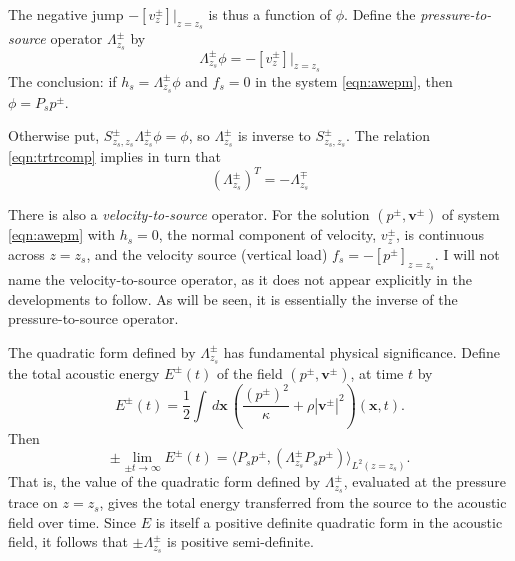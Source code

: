 \documentclass[georeport,12pt]{geophysics}
\newcommand{\bx}{\mathbf{x}}
\newcommand{\bv}{\mathbf{v}}
\begin{document}
The negative jump $-[v^{\pm}_{z}]|_{z=z_s}$ is thus a function of $\phi$. Define
the {\em pressure-to-source} operator $\Lambda^{\pm}_{z_s}$ by
\begin{equation}
  \label{eqn:deflam}
  \Lambda^{\pm}_{z_s}\phi = -[v^{\pm}_{z}]|_{z=z_s}
\end{equation}
The conclusion: if $h_s = \Lambda^{\pm}_{z_s}\phi$ and $f_s=0$ in the
system \ref{eqn:awepm}, then $\phi=P_sp^{\pm}$.

Otherwise put, $S^{\pm}_{z_s,z_s}\Lambda^{\pm}_{z_s} \phi = \phi$, so
$\Lambda^{\pm}_{z_s}$ is inverse to $S^{\pm}_{z_s,z_s}$. The relation
\ref{eqn:trtrcomp} implies in turn that
\begin{equation}
  \label{eqn:lamadj}
  (\Lambda^{\pm}_{z_s})^T = - \Lambda^{\mp}_{z_s}
\end{equation}

There is also a {\em velocity-to-source} operator. For the solution
$(p^{\pm},\bv^{\pm})$ of system \ref{eqn:awepm} with $h_s=0$, the
normal component of velocity, $v^{\pm}_z$, is continuous across
$z=z_s$, and the velocity source (vertical load)
$f_s=-[p^{\pm}]_{z=z_s}$. I will not name the velocity-to-source
operator, as it does not appear explicitly in the developments to
follow. As will be seen, it is essentially the inverse of the
pressure-to-source operator.

The quadratic form defined by $\Lambda^{\pm}_{z_s}$ has fundamental
physical significance. Define the total acoustic energy $E^{\pm}(t)$ of the
field $(p^{\pm},\bv^{\pm})$, at time $t$ by
\begin{equation}
  \label{eqn:defae0}
  E^{\pm}(t) = \frac{1}{2} \int \,d\bx \, \left(\frac{(p^{\pm})^2}{\kappa} + \rho |\bv^{\pm}|^2\right)(\bx,t).
\end{equation}
Then
\begin{equation}
  \label{eqn:elim}
  \pm \lim_{\pm t \rightarrow \infty} E^{\pm}(t) =  \langle P_sp^{\pm},
  (\Lambda^{\pm}_{z_s} P_sp^{\pm}) \rangle_{L^2(z=z_s)}.
\end{equation}
That is, the value of the quadratic form defined by
$\Lambda^{\pm}_{z_s}$, evaluated at the pressure trace on $z=z_s$,
gives the total energy transferred from the source to the
acoustic field over time. Since $E$ is itself a positive definite
quadratic form in the acoustic field, it follows that $\pm
\Lambda^{\pm}_{z_s}$ is positive semi-definite. 
\end{document}
